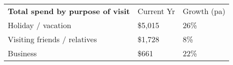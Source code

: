 \begin{tabular}[t]{p{5.1cm}>{\hfill}p{1.1cm}>{\hfill}p{1.3cm}}
 \textbf{Total spend by purpose of visit} & Current Yr & Growth (pa) \\ 
 Holiday / vacation & \$5,015 & 26\% \\ 
  Visiting friends / relatives & \$1,728 & 8\% \\ 
  Business & \$661   & 22\% \\ 
  \end{tabular}
